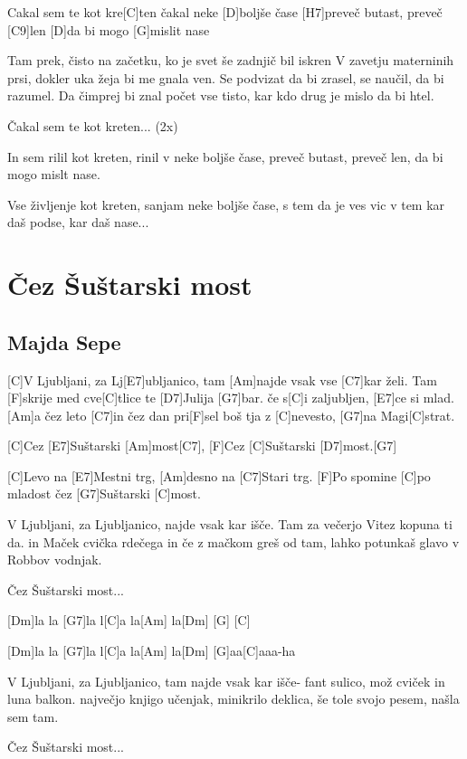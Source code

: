 \documentclass[a4paper,12pt]{article}
\begin{document}
\begin{multicols}{2}
\begin{guitar}
[D]Cakal sem te kot kre[C]ten
čakal neke [D]boljše čase
[H7]preveč butast, preveč [C9]len
[D]da bi mogo [G]mislit nase


Tam prek, čisto na začetku,
ko je svet še zadnjič bil iskren
V zavetju materninih prsi, 
dokler uka žeja bi me gnala ven.
Se podvizat da bi zrasel, 
se naučil, da bi razumel.
Da čimprej bi znal počet vse tisto,
kar kdo drug je mislo da bi htel.


Čakal sem te kot kreten... (2x)


In sem rilil kot kreten,
rinil v neke boljše čase, 
preveč butast, preveč len, 
da bi mogo mislt nase.


Vse življenje kot kreten,
sanjam neke boljše čase,
s tem da je ves vic v tem
kar daš podse, kar daš nase...

\end{guitar}
\section{Čez Šuštarski most}
\subsection*{Majda Sepe}
\begin{guitar}
[Dm G7 C Am Dm G C] 


[C]V Ljubljani, za Lj[E7]ubljanico,
tam [Am]najde vsak vse [C7]kar želi.
Tam [F]skrije med cve[C]tlice te [D7]Julija [G7]bar.
če s[C]i zaljubljen, [E7]ce si mlad.
[Am]a čez leto [C7]in čez dan
pri[F]sel boš tja z [C]nevesto, [G7]na Magi[C]strat.


[C]Cez [E7]Suštarski [Am]most[C7],
[F]Cez [C]Suštarski [D7]most.[G7]

[C]Levo na [E7]Mestni trg, [Am]desno na [C7]Stari trg.
[F]Po spomine [C]po mladost čez [G7]Suštarski [C]most.


V Ljubljani, za Ljubljanico, 
najde vsak kar išče.
Tam za večerjo Vitez kopuna ti da.
in Maček cvička rdečega
in če z mačkom greš  od tam,
lahko potunkaš  glavo v Robbov vodnjak.

Čez Šuštarski most...


[Dm]la la [G7]la  l[C]a la[Am] la[Dm]  [G]   [C]

[Dm]la la [G7]la  l[C]a la[Am] la[Dm]  [G]aa[C]aaa-ha 


V Ljubljani, za Ljubljanico, 
tam najde vsak kar išče-
fant sulico, mož cviček in luna balkon.
največjo knjigo učenjak, minikrilo deklica,
še tole svojo pesem, našla sem tam.


Čez Šuštarski most...



\end{guitar}
\end{multicols}
\end{document}
